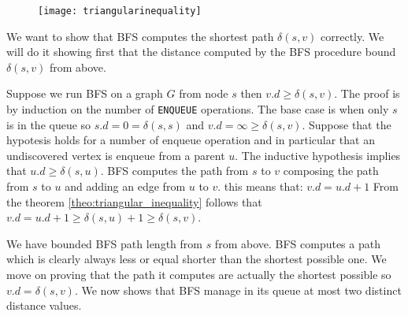 	\begin{figure}
	\label{fig:triangularinequality}
	\centering
		\texttt{[image: triangularinequality]}
	\end{figure}

We want to show that BFS computes the shortest path $\delta(s,v)$ correctly. We will do it showing first that the distance computed by the BFS procedure bound $\delta(s,v)$ from above.

\begin{theorem}
Suppose we run BFS on a graph $G$ from node $s$ then $v.d \geq \delta(s,v)$. The proof is by induction on the number of \texttt{ENQUEUE} operations. The base case is when only $s$ is in the queue so 
$s.d = 0  = \delta(s,s)$ and $v.d = \infty \geq \delta(s,v)$. Suppose that the hypotesis holds for a number of enqueue operation and in particular that an undiscovered vertex is enqueue from a parent $u$. The inductive hypothesis implies that $u.d \geq \delta(s,u)$. BFS computes the path from $s$ to $v$ composing the path from $s$ to $u$ and adding an edge from $u$ to $v$. this means that: $v.d = u.d +1$
From the theorem \ref{theo:triangular_inequality} follows that $v.d = u.d +1 \geq \delta(s,u) +1 \geq \delta(s,v)$.
\end{theorem}

We have bounded BFS path length from $s$ from above. BFS computes a path which is clearly always less or equal shorter than the shortest possible one. We move on proving that the path it computes are actually the shortest possible so $v.d = \delta(s,v)$.
We now shows that BFS manage in its queue at most two distinct distance values.

